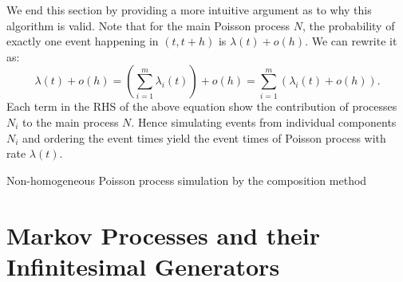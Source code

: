\documentclass[report.tex]{subfiles}
\begin{document}
We end this section by providing a more intuitive argument as to why
this algorithm is valid.
Note that for the main Poisson process $N$, the probability of exactly one event happening
in $(t, t+h)$ is $\lambda(t) + o(h)$. We can rewrite it as:
$$
\lambda(t) + o(h)
= \left( \sum_{i=1}^{m} \lambda_{i}(t) \right) + o(h)
= \sum_{i=1}^{m} \left( \lambda_{i}(t) + o(h) \right).
$$
Each term in the RHS of the above equation show the contribution of processes $N_{i}$
to the main process $N$.
Hence simulating events from individual components $N_{i}$ and ordering the
event times yield the event times of Poisson process with rate $\lambda(t)$.




\begin{algorithm}
\caption{Non-homogeneous Poisson process simulation by the composition method}
\label{alg-pp-composition-method}
\begin{algorithmic}
  \EndFor
  \EndFor
\end{algorithmic}
\end{algorithm}

\section{Markov Processes and their Infinitesimal Generators}
\end{document}
